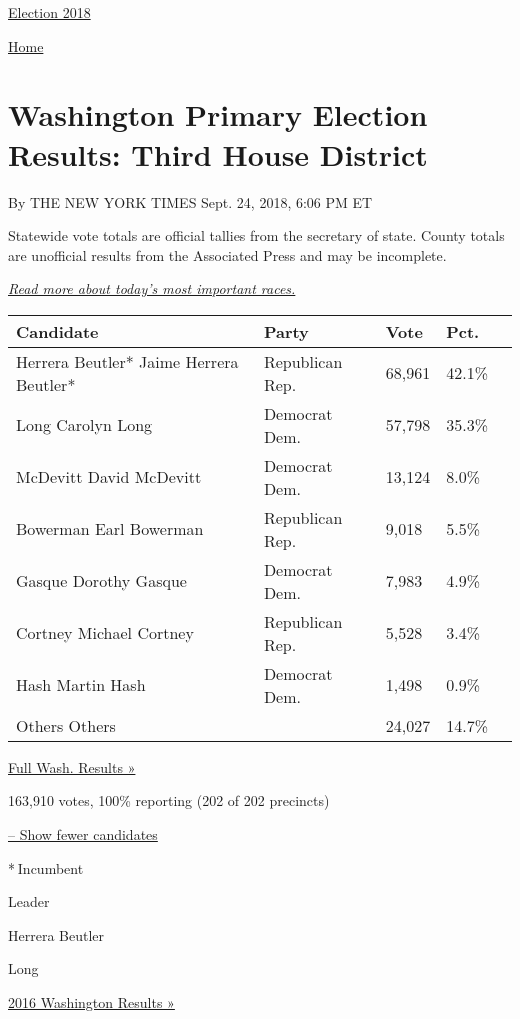 \href{//www.nytimes3xbfgragh.onion}{}\href{https://www.nytimes3xbfgragh.onion/interactive/2018/us/elections/calendar-primary-results.html}{
Election 2018}

\href{//www.nytimes3xbfgragh.onion}{ Home}

\hypertarget{washington-primary-election-results-third-house-district}{%
\section{Washington Primary Election Results: Third House
District}\label{washington-primary-election-results-third-house-district}}

By THE NEW YORK TIMES Sept. 24, 2018, 6:06 PM ET

Statewide vote totals are official tallies from the secretary of state.
County totals are unofficial results from the Associated Press and may
be incomplete.

\href{https://www.nytimes3xbfgragh.onion/2018/08/07/us/politics/primary-election-today.html}{\emph{Read
more about today's most important races.}}

\begin{longtable}[]{@{}lllll@{}}
\toprule
Candidate & Party & Vote & Pct. &\tabularnewline
\midrule
\endhead
 Herrera Beutler* Jaime Herrera Beutler* & Republican Rep. & 68,961 &
42.1\% &\tabularnewline
 Long Carolyn Long & Democrat Dem. & 57,798 & 35.3\% &\tabularnewline
 McDevitt David McDevitt & Democrat Dem. & 13,124 & 8.0\%
&\tabularnewline
 Bowerman Earl Bowerman & Republican Rep. & 9,018 & 5.5\%
&\tabularnewline
 Gasque Dorothy Gasque & Democrat Dem. & 7,983 & 4.9\% &\tabularnewline
 Cortney Michael Cortney & Republican Rep. & 5,528 & 3.4\%
&\tabularnewline
 Hash Martin Hash & Democrat Dem. & 1,498 & 0.9\% &\tabularnewline
 Others Others & & 24,027 & 14.7\% &\tabularnewline
\bottomrule
\end{longtable}

\href{https://www.nytimes3xbfgragh.onion/elections/results/washington}{Full
Wash. Results »}

163,910 votes, 100\% reporting (202 of 202 precincts)

\protect\hyperlink{}{-- Show fewer candidates}

* Incumbent

Leader

 Herrera Beutler

 Long

\href{https://www.nytimes3xbfgragh.onion/elections/results/washington}{2016
Washington Results »}

